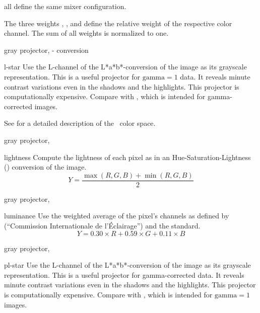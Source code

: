 \begin{codelist}
\begin{codelist}
    all define the same mixer configuration.

    The three weights ,
    , and  define
    the relative weight of the respective color channel.  The sum of
    all weights is normalized to one.

           {gray projector, }%
           {- conversion}%
  \item[l-star]\itemend Use the L-channel of the L*a*b*-conversion of
    the image as its grayscale representation.  This is a useful
    projector for $\mbox{gamma} = 1$ data.  It reveals minute contrast
    variations even in the shadows and the highlights.  This projector
    is computationally expensive.  Compare with ,
    which is intended for gamma-corrected images.

    See  for a detailed
    description of the ~color space.

           {gray projector, }%
  \item[lightness]\itemend Compute the lightness of each 
    pixel as in an Hue\hyp{}Saturation\hyp{}Lightness ()
    conversion of the image.
    \[
    Y = \frac{\max(R, G, B) + \min(R, G, B)}{2}
    \]

           {gray projector, }%
  \item[luminance]\itemend Use the weighted average of the
     pixel's channels as defined by 
    (``Commission Internationale de l'\'Eclairage'') and the
     standard.
    \[
    Y = 0.30 \times R + 0.59 \times G + 0.11 \times B
    \]

           {gray projector, }%
  \item[pl-star]\itemend Use the L-channel of the L*a*b*-conversion of
    the image as its grayscale representation.  This is a useful
    projector for gamma-corrected data.  It reveals minute contrast
    variations even in the shadows and the highlights.  This projector
    is computationally expensive.  Compare with , which
    is intended for $\mbox{gamma} = 1$ images.


\end{codelist}
\end{codelist}

